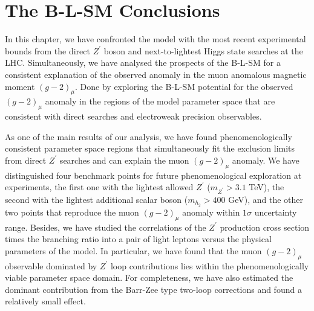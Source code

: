\section{The B-L-SM Conclusions}
\label{sec:Conclusions BLSM}


In this chapter, we have confronted the model with the most recent experimental bounds from the direct $Z^\prime$ boson and next-to-lightest Higgs state searches at the LHC.
%
Simultaneously, we have analysed the prospects of the B-L-SM for a consistent explanation of the observed anomaly in the muon anomalous magnetic moment $(g-2)_{\mu}$. 
%
Done by exploring the B-L-SM potential for the observed $(g-2)_{\mu}$ anomaly in the regions of the model parameter space that are consistent with direct searches and electroweak precision observables.

As one of the main results of our analysis, we have found phenomenologically consistent parameter space regions that simultaneously fit the exclusion limits from direct $Z^\prime$ searches and can explain the muon $(g-2)_{\mu}$ anomaly. 
%
We have distinguished four benchmark points for future phenomenological exploration at experiments, the first one with the lightest allowed $Z^\prime$ ($m_{Z^\prime}>3.1$ TeV), the second with the lightest additional scalar boson ($m_{h_2}>400$ GeV), and the other two points that reproduce the muon $(g-2)_{\mu}$ anomaly within $1\sigma$ uncertainty range. 
%
Besides, we have studied the correlations of the $Z^\prime$ production cross section times the branching ratio into a pair of light leptons versus the physical parameters of the model.
%
In particular, we have found that the muon $(g-2)_{\mu}$ observable dominated by $Z^\prime$ loop contributions lies within the phenomenologically viable parameter space domain. 
%
For completeness, we have also estimated the dominant contribution from the Barr-Zee type two-loop corrections and found a relatively small effect.

